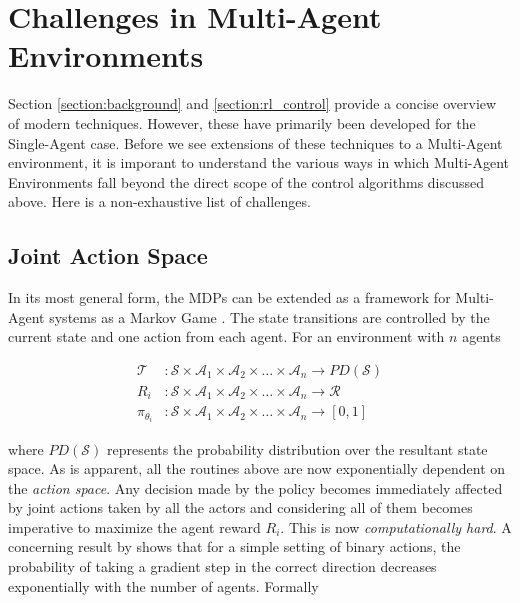 \documentclass[12pt,a4paper]{article}
\begin{document}
\section{Challenges in Multi-Agent Environments} \label{section:challenges}

Section \ref{section:background} and \ref{section:rl_control} provide a concise overview of
modern techniques. However, these have primarily been developed for the Single-Agent case.
Before we see extensions of these techniques to a Multi-Agent environment, it is imporant
to understand the various ways in which Multi-Agent Environments fall beyond the direct scope
of the control algorithms discussed above. Here is a non-exhaustive list of challenges.

\subsection{Joint Action Space} \label{section:joint_action_space}

In its most general form, the MDPs can be extended as a framework for Multi-Agent systems
as a Markov Game \cite{Littman:1994:MGF:3091574.3091594}. The state transitions are 
controlled by the current state and one action from each agent. For an environment with $n$ 
agents

\begin{align}
\mathcal{T}&: \mathcal{S} \times \mathcal{A}_{1} \times \mathcal{A}_2 \times \dotsc \times \mathcal{A}_n \to PD(\mathcal{S}) \\
R_i&: \mathcal{S} \times \mathcal{A}_{1} \times \mathcal{A}_2 \times \dotsc \times \mathcal{A}_n \to \mathcal{R} \\
\pi_{\theta_i}&: \mathcal{S} \times \mathcal{A}_{1} \times \mathcal{A}_2 \times \dotsc \times \mathcal{A}_n \to [0,1]
\end{align}

where $PD(\mathcal{S})$ represents the probability distribution over the resultant state space.
As is apparent, all the routines above are now exponentially dependent on the \textit{action
space}. Any decision made by the policy becomes immediately affected by joint actions taken
by all the actors and considering all of them becomes imperative to maximize the agent reward
$R_i$. This is now \textit{computationally hard}. A concerning result by
\cite{2017arXiv170602275L} shows that for a simple setting of binary actions, the probability of
taking a gradient step in the correct direction decreases exponentially with the number of agents. Formally
\end{document}
